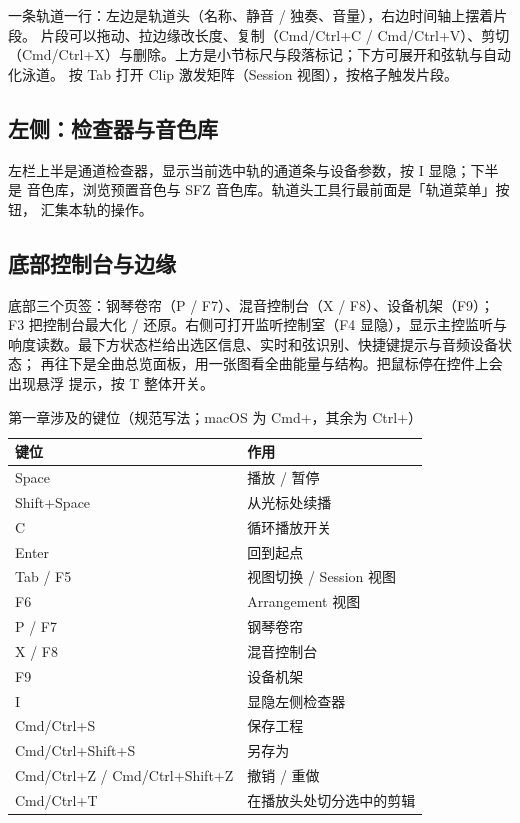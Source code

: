 一条轨道一行：左边是轨道头（名称、静音 / 独奏、音量），右边时间轴上摆着片段。
片段可以拖动、拉边缘改长度、复制（Cmd/Ctrl+C / Cmd/Ctrl+V）、剪切
（Cmd/Ctrl+X）与删除。上方是小节标尺与段落标记；下方可展开和弦轨与自动化泳道。
按 Tab 打开 Clip 激发矩阵（Session 视图），按格子触发片段。

\subsection{左侧：检查器与音色库}

左栏上半是通道检查器，显示当前选中轨的通道条与设备参数，按 I 显隐；下半是
音色库，浏览预置音色与 SFZ 音色库。轨道头工具行最前面是「轨道菜单」按钮，
汇集本轨的操作。

\subsection{底部控制台与边缘}

底部三个页签：钢琴卷帘（P / F7）、混音控制台（X / F8）、设备机架（F9）；
F3 把控制台最大化 / 还原。右侧可打开监听控制室（F4 显隐），显示主控监听与
响度读数。最下方状态栏给出选区信息、实时和弦识别、快捷键提示与音频设备状态；
再往下是全曲总览面板，用一张图看全曲能量与结构。把鼠标停在控件上会出现悬浮
提示，按 T 整体开关。

\begin{table}[htbp]
\centering
\caption{第一章涉及的键位（规范写法；macOS 为 Cmd+，其余为 Ctrl+）}
\label{tab:ch01-keys}
\begin{tabular}{ll}
\hline
键位 & 作用 \\
\hline
Space & 播放 / 暂停 \\
Shift+Space & 从光标处续播 \\
C & 循环播放开关 \\
Enter & 回到起点 \\
Tab / F5 & 视图切换 / Session 视图 \\
F6 & Arrangement 视图 \\
P / F7 & 钢琴卷帘 \\
X / F8 & 混音控制台 \\
F9 & 设备机架 \\
I & 显隐左侧检查器 \\
Cmd/Ctrl+S & 保存工程 \\
Cmd/Ctrl+Shift+S & 另存为 \\
Cmd/Ctrl+Z / Cmd/Ctrl+Shift+Z & 撤销 / 重做 \\
Cmd/Ctrl+T & 在播放头处切分选中的剪辑 \\
\hline
\end{tabular}
\end{table}

